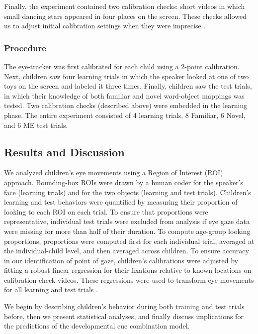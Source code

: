 \documentclass[man,floatsintext]{apa6}
\begin{document}
Finally, the experiment contained two calibration checks: short videos in which small dancing stars appeared in four places on the screen. These checks allowed us to adjust initial calibration settings when they were imprecise \cite<for details of this procedure, see>{Frank2012d}.

\subsubsection{Procedure}

The eye-tracker was first calibrated for each child using a 2-point calibration. Next, children saw four learning trials in which the speaker looked at one of two toys on the screen and labeled it three times. Finally, children saw the test trials, in which their knowledge of both familiar and novel word-object mappings was tested. Two calibration checks (described above) were embedded in the learning phase. The entire experiment consisted of 4 learning trials, 8 Familiar, 6 Novel, and 6 ME test trials.

\subsection{Results and Discussion}

We analyzed children's eye movements using a Region of Interest (ROI) approach. Bounding-box ROIs were drawn by a human coder for the speaker's face (learning trials) and for the two objects (learning and test trials). Children's learning and test behaviors were quantified by measuring their proportion of looking to each ROI on each trial. To ensure that proportions were representative, individual test trials were excluded from analysis if eye gaze data were missing for more than half of their duration. To compute age-group looking proportions, proportions were computed first for each individual trial, averaged at the individual-child level, and then averaged across children. To ensure accuracy in our identification of point of gaze, children's calibrations were adjusted by fitting a robust linear regression for their fixations relative to known locations on calibration check videos. These regressions were used to transform eye movements for all learning and test trials \cite{Frank2012d}.

We begin by describing children's behavior during both training and test trials before, then we present statistical analyses, and finally discuss implications for the predictions of the developmental cue combination model. 
\end{document}
